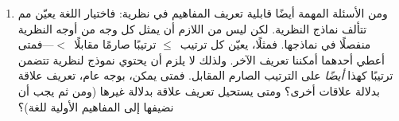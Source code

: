 \documentclass[../../../include/open-logic-section]{subfiles}
\begin{document}
\begin{explain}
\begin{enumerate}
  $(\Gamma \setminus \{!A\}) \cup \{\lnot !A\}$ قابلة
  للإرضاء. وبهذه الطريقة، مثلًا، أُثبت أن مسلمة التوازي مستقلة عن
  سائر بديهيات الهندسة.
\item ومن الأسئلة المهمة أيضًا قابلية تعريف المفاهيم في نظرية:
  فاختيار اللغة يعيّن مم تتألف نماذج النظرية. لكن ليس من اللازم أن
  يمثل كل وجه من أوجه النظرية منفصلًا في نماذجها. فمثلًا، يعيّن كل
  ترتيب~$\le$ ترتيبًا صارمًا مقابلًا~$<$---فمتى أعطي أحدهما أمكننا
  تعريف الآخر. ولذلك لا يلزم أن يحتوي نموذج لنظرية تتضمن ترتيبًا
  كهذا \emph{أيضًا} على الترتيب الصارم المقابل. فمتى يمكن، بوجه
  عام، تعريف علاقة بدلالة علاقات أخرى؟ ومتى يستحيل تعريف علاقة
  بدلالة غيرها (ومن ثم يجب أن نضيفها إلى المفاهيم الأولية للغة)؟
\end{enumerate}
\end{explain}
\end{document}
